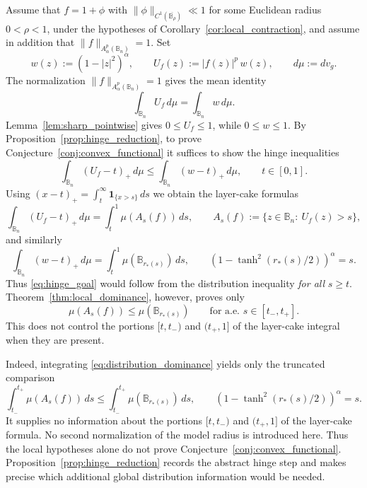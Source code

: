 \documentclass[11pt]{amsart}
\theoremstyle{plain}
\theoremstyle{definition}
\theoremstyle{remark}
\newcommand{\B}{\mathbb{B}}
\begin{document}
Assume that $f=1+\phi$ with
$\|\phi\|_{C^1(\overline{\B_{\rho}})}\ll1$ for some Euclidean radius
$0<\rho<1$, under the hypotheses of Corollary~\ref{cor:local_contraction}, and
assume in addition that $\|f\|_{A^p_\alpha(\B_n)}=1$. Set
\[
w(z):=(1-|z|^2)^\alpha,\qquad U_f(z):=|f(z)|^p\,w(z),\qquad d\mu:=dv_g .
\]
The normalization $\|f\|_{A^p_\alpha(\B_n)}=1$ gives the mean identity
\begin{equation*}\label{eq:mean_match}
\int_{\B_n}U_f\,d\mu=\int_{\B_n}w\,d\mu.
\end{equation*}
Lemma~\ref{lem:sharp_pointwise} gives $0\le U_f\le1$, while $0\le w\le1$.
By Proposition~\ref{prop:hinge_reduction}, to prove Conjecture~\ref{conj:convex_functional} it suffices to show the hinge inequalities
\begin{equation}\label{eq:hinge_goal}
\int_{\B_n}(U_f-t)_+\,d\mu\le \int_{\B_n}(w-t)_+\,d\mu,\qquad t\in[0,1].
\end{equation}
Using $(x-t)_+=\int_t^\infty\mathbf 1_{\{x>s\}}\,ds$ we obtain the layer-cake formulas
\begin{equation}\label{eq:layer_cake}
\int_{\B_n}(U_f-t)_+\,d\mu=\int_t^1 \mu(A_s(f))\,ds,\qquad
A_s(f):=\{z\in\B_n:\ U_f(z)>s\},
\end{equation}
and similarly
\[
\int_{\B_n}(w-t)_+\,d\mu=\int_t^1 \mu(\B_{r_*(s)})\,ds,
\qquad (1-\tanh^2(r_*(s)/2))^\alpha=s.
\]
Thus \eqref{eq:hinge_goal} would follow from the distribution inequality
\emph{for all} $s\ge t$.  Theorem~\ref{thm:local_dominance}, however, proves only
\begin{equation}\label{eq:distribution_dominance}
\mu(A_s(f))\le \mu(\B_{r_*(s)})\qquad\text{for a.e.\ }s\in[t_-,t_+].
\end{equation}
This does not control the portions $[t,t_-)$ and $(t_+,1]$ of the
layer-cake integral when they are present.

Indeed, integrating \eqref{eq:distribution_dominance} yields only the
truncated comparison
\[
 \int_{t_-}^{t_+}\mu(A_s(f))\,ds
 \le \int_{t_-}^{t_+}\mu(\B_{r_*(s)})\,ds,
 \qquad (1-\tanh^2(r_*(s)/2))^\alpha=s.
\]
It supplies no information about the portions $[t,t_-)$ and
$(t_+,1]$ of the layer-cake formula. No second normalization of the model
radius is introduced here.
Thus the local hypotheses alone do not prove
Conjecture~\ref{conj:convex_functional}. Proposition~\ref{prop:hinge_reduction}
records the abstract hinge step and makes precise which additional global
distribution information would be needed.
\end{document}
